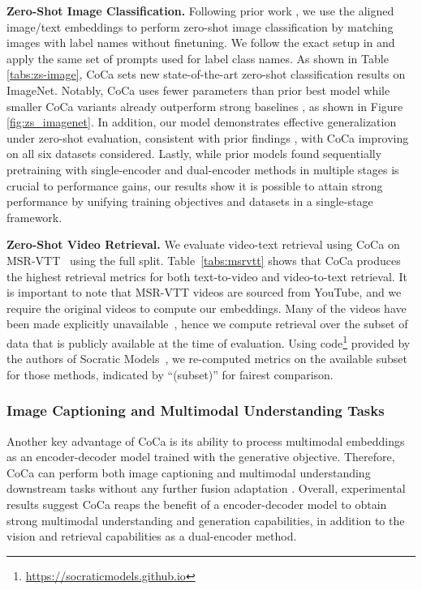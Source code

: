 \textbf{Zero-Shot Image Classification.}
Following prior work \cite{radford2021learning,jia2021scaling},
we use the aligned image/text embeddings to perform zero-shot image classification by matching images with label names without finetuning.
We follow the exact setup in \cite{radford2021learning} and apply the same set of prompts used for label class names.
As shown in Table \ref{tabs:zs-image},
CoCa sets new state-of-the-art zero-shot classification results on ImageNet.
Notably, CoCa uses fewer parameters than prior best model \cite{pham2021combined} while smaller CoCa variants already outperform strong baselines \cite{radford2021learning,yuan2021florence}, as shown in Figure \ref{fig:zs_imagenet}.
In addition,
our model demonstrates effective generalization under zero-shot evaluation,
consistent with prior findings \cite{radford2021learning,jia2021scaling},
with CoCa improving on all six datasets considered.
Lastly,
while prior models \cite{zhai2021lit,pham2021combined} found sequentially pretraining with single-encoder and dual-encoder methods in multiple stages 
is crucial to performance gains,
our results show it is possible to attain strong performance by unifying training objectives and datasets in a single-stage framework.


\textbf{Zero-Shot Video Retrieval.} 
We evaluate video-text retrieval using CoCa on MSR-VTT~\cite{xu2016msr} using the full split. 
Table~\ref{tabs:msrvtt} shows that CoCa produces the highest retrieval metrics for both text-to-video and video-to-text retrieval. 
It is important to note that MSR-VTT videos are sourced from YouTube, and we require the original videos to compute our embeddings. 
Many of the videos have been made explicitly unavailable~\cite{smaira2020short},
hence we compute retrieval over the subset of data that is publicly available at the time of evaluation.  
Using code\footnote{\url{https://socraticmodels.github.io}} provided by the authors of Socratic Models~\cite{zeng2022socratic},
we re-computed metrics on the available subset for those methods, indicated by ``(subset)'' for fairest comparison.





\subsubsection{Image Captioning and Multimodal Understanding Tasks}

Another key advantage of CoCa is its ability to process multimodal embeddings as an encoder-decoder model trained with the generative objective.
Therefore,
CoCa can perform both image captioning and multimodal understanding downstream tasks without any further fusion adaptation \cite{shen2021much,dou2021empirical}.
Overall,
experimental results suggest CoCa reaps the benefit of a encoder-decoder model to obtain strong multimodal understanding and generation capabilities,
in addition to the vision and retrieval capabilities as a dual-encoder method.


